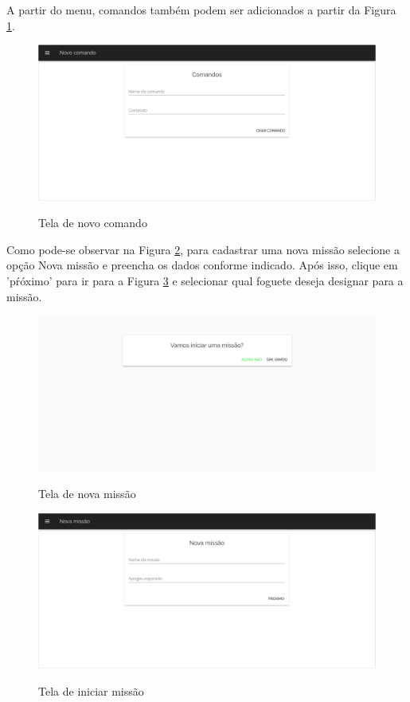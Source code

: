 A partir do menu, comandos também podem ser adicionados a partir da Figura \ref{teladecomando}. 
\begin{center}
\begin{figure}[H]					\includegraphics[width=\textwidth]{Figuras/telas/3.png}
        \label{teladecomando}
	\caption{Tela de novo comando}
\end{figure} 
\end{center}

Como pode-se observar na Figura \ref{telanovamissao}, para cadastrar uma nova missão selecione a opção Nova missão e preencha os dados conforme indicado. Após isso, clique em 'pŕóximo' para ir para a Figura \ref{telainiciarmissao} e selecionar qual foguete deseja designar para a missão.
\begin{center}
    

\begin{figure}[H]					\includegraphics[width=\textwidth]{Figuras/telas/4.png}
        \label{telanovamissao}
	\caption{ Tela de nova missão}
\end{figure} 
\end{center}


\begin{center}
    

\begin{figure}[H]					\includegraphics[width=\textwidth]{Figuras/telas/5.png}
        \label{telainiciarmissao}
	\caption{ Tela de iniciar missão}
\end{figure} 
\end{center}